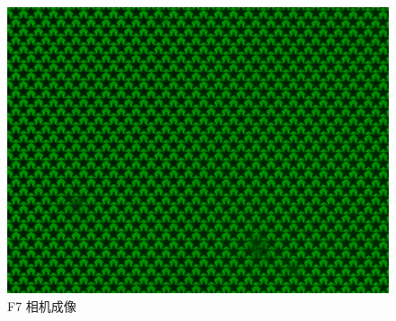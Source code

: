 \documentclass{ctexart}
\begin{document}
\begin{figure}[H]
\begin{minipage}[b]{0.3\textwidth}
    \includegraphics[width=\textwidth]{pictures/F7-nomask.png}
    \caption{F7 相机成像}
  \end{minipage}
\end{figure}
\end{document}
